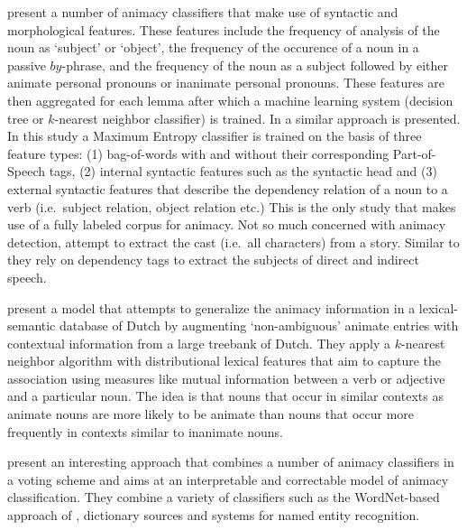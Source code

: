 \documentclass[a4paper,UKenglish]{oasics}
\begin{document}
\cite{ovrelid:04,ovrelid:05,ovrelid:06,ovrelid:08,ovrelid:09} present
a number of animacy classifiers that make use of syntactic and
morphological features. These features include the frequency of analysis of the noun as `subject' or `object', the frequency of the occurence of a noun in a passive $by$-phrase, and the frequency of the noun as a subject followed by either animate personal pronouns or
inanimate personal pronouns. These features are then aggregated for
each lemma after which a machine learning system (decision tree or
$k$-nearest neighbor classifier) is trained. In \cite{bowman:12} a
similar approach is presented. In this study a Maximum Entropy
classifier is trained on the basis of three feature types: (1)
bag-of-words with and without their corresponding Part-of-Speech tags,
(2) internal syntactic features such as the syntactic head and (3)
external syntactic features that describe the dependency relation of a
noun to a verb (i.e.\ subject relation, object relation etc.)  This is
the only study that makes use of a fully labeled corpus for animacy.
Not so much concerned with animacy detection, \cite{karsdorp:12}
attempt to extract the cast (i.e.\ all characters) from a
story. Similar to \cite{bowman:12} they rely on dependency tags to
extract the subjects of direct and indirect speech.

\cite{bloem:13} present a model that attempts to generalize the
animacy information in a lexical-semantic database of Dutch by
augmenting `non-ambiguous' animate entries with contextual information
from a large treebank of Dutch. They apply a $k$-nearest neighbor
algorithm with distributional lexical features that aim to capture the
association using measures like mutual information between a verb or
adjective and a particular noun. The idea is that nouns that occur in
similar contexts as animate nouns are more likely to be animate than
nouns that occur more frequently in contexts similar to inanimate nouns.

\cite{moore:13} present an interesting approach that combines a number
of animacy classifiers in a voting scheme and aims at an interpretable
and correctable model of animacy classification. They combine a
variety of classifiers such as the WordNet-based approach of
\cite{evans:00}, dictionary sources and systems for named entity
recognition.
\end{document}
